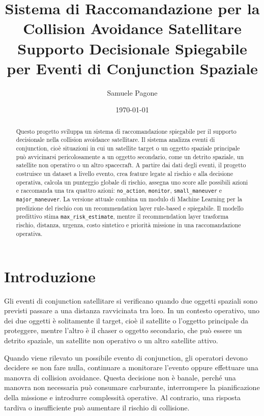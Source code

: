 \documentclass[12pt,a4paper]{article}
\title{\textbf{Sistema di Raccomandazione per la Collision Avoidance Satellitare}\\
\large Supporto Decisionale Spiegabile per Eventi di Conjunction Spaziale}
\author{Samuele Pagone}
\date{\today}
\begin{document}
\maketitle

\begin{abstract}
Questo progetto sviluppa un sistema di raccomandazione spiegabile per il supporto decisionale nella collision avoidance satellitare. Il sistema analizza eventi di conjunction, cioè situazioni in cui un satellite target o un oggetto spaziale principale può avvicinarsi pericolosamente a un oggetto secondario, come un detrito spaziale, un satellite non operativo o un altro spacecraft. A partire dai dati degli eventi, il progetto costruisce un dataset a livello evento, crea feature legate al rischio e alla decisione operativa, calcola un punteggio globale di rischio, assegna uno score alle possibili azioni e raccomanda una tra quattro azioni: \texttt{no\_action}, \texttt{monitor}, \texttt{small\_maneuver} e \texttt{major\_maneuver}. La versione attuale combina un modulo di Machine Learning per la predizione del rischio con un recommendation layer rule-based e spiegabile. Il modello predittivo stima \texttt{max\_risk\_estimate}, mentre il recommendation layer trasforma rischio, distanza, urgenza, costo sintetico e priorità missione in una raccomandazione operativa.
\end{abstract}

\tableofcontents
\newpage

\section{Introduzione}

Gli eventi di conjunction satellitare si verificano quando due oggetti spaziali sono previsti passare a una distanza ravvicinata tra loro. In un contesto operativo, uno dei due oggetti è solitamente il target, cioè il satellite o l'oggetto principale da proteggere, mentre l'altro è il chaser o oggetto secondario, che può essere un detrito spaziale, un satellite non operativo o un altro satellite attivo.

Quando viene rilevato un possibile evento di conjunction, gli operatori devono decidere se non fare nulla, continuare a monitorare l'evento oppure effettuare una manovra di collision avoidance. Questa decisione non è banale, perché una manovra non necessaria può consumare carburante, interrompere la pianificazione della missione e introdurre complessità operative. Al contrario, una risposta tardiva o insufficiente può aumentare il rischio di collisione.
\end{document}
